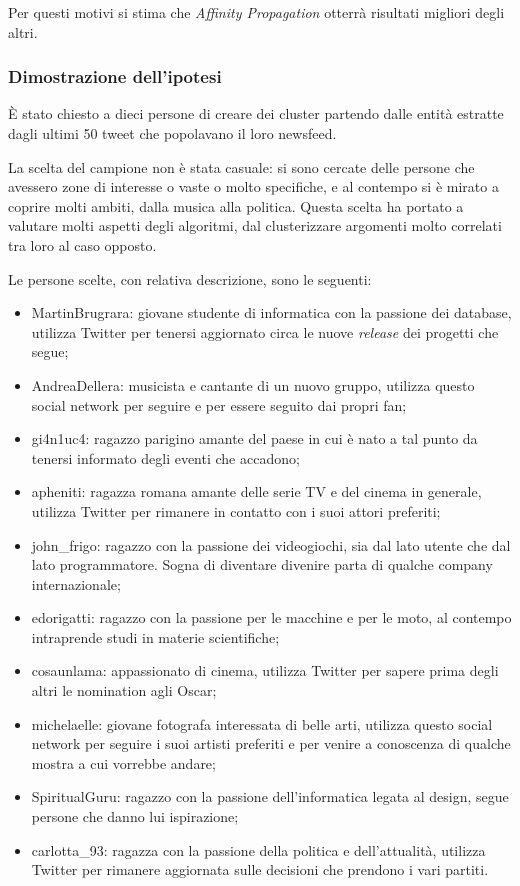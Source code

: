 Per questi motivi si stima che \emph{Affinity Propagation} otterrà risultati migliori degli altri.

\subsubsection{Dimostrazione dell'ipotesi}
È stato chiesto a dieci persone di creare dei cluster partendo dalle entità estratte dagli ultimi 50 tweet che popolavano il loro newsfeed.

La scelta del campione non è stata casuale: si sono cercate delle persone che avessero zone di interesse o vaste o molto specifiche, e al contempo si è mirato a coprire molti ambiti, dalla musica alla politica. Questa scelta ha portato a valutare molti aspetti degli algoritmi, dal clusterizzare argomenti molto correlati tra loro al caso opposto. 

Le persone scelte, con relativa descrizione, sono le seguenti:
\begin{itemize}
	\item MartinBrugrara: giovane studente di informatica con la passione dei database, utilizza Twitter per tenersi aggiornato circa le nuove \emph{release} dei progetti che segue;
	\item AndreaDellera: musicista e cantante di un nuovo gruppo, utilizza questo social network per seguire e per essere seguito dai propri fan;
	\item gi4n1uc4: ragazzo parigino amante del paese in cui è nato a tal punto da tenersi informato degli eventi che accadono;
	\item apheniti: ragazza romana amante delle serie TV e del cinema in generale, utilizza Twitter per rimanere in contatto con i suoi attori preferiti;
	\item john\_frigo: ragazzo con la passione dei videogiochi, sia dal lato utente che dal lato programmatore. Sogna di diventare divenire parta di qualche company internazionale;
	\item edorigatti: ragazzo con la passione per le macchine e per le moto, al contempo intraprende studi in materie scientifiche;
	\item cosaunlama: appassionato di cinema, utilizza Twitter per sapere prima degli altri le nomination agli Oscar;
	\item michelaelle: giovane fotografa interessata di belle arti, utilizza questo social network per seguire i suoi artisti preferiti e per venire a conoscenza di qualche mostra a cui vorrebbe andare; 
	\item SpiritualGuru: ragazzo con la passione dell'informatica legata al design, segue persone che danno lui ispirazione;
	\item carlotta\_93: ragazza con la passione della politica e dell'attualità, utilizza Twitter per rimanere aggiornata sulle decisioni che prendono i vari partiti.
\end{itemize}

